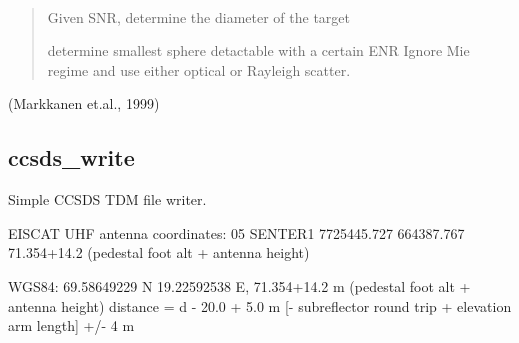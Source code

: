 \documentclass[letterpaper,10pt,english]{sphinxmanual}
\begin{document}
\begin{fulllineitems}
\label{\detokenize{modules/debris:debris.target_diameter}}~\begin{quote}

Given SNR, determine the diameter of the target

determine smallest sphere detactable with a certain ENR
Ignore Mie regime and use either optical or Rayleigh scatter.
\end{quote}

(Markkanen et.al., 1999)

\end{fulllineitems}



\subsection{ccsds\_write}
\label{\detokenize{modules/ccsds_write:module-ccsds_write}}\label{\detokenize{modules/ccsds_write:ccsds-write}}\label{\detokenize{modules/ccsds_write::doc}}
Simple CCSDS TDM file writer.

EISCAT UHF antenna coordinates:
05 SENTER1              7725445.727  664387.767   71.354+14.2 (pedestal foot alt + antenna height)

WGS84: 69.58649229 N 19.22592538 E, 71.354+14.2 m (pedestal foot alt + antenna height)
distance = d - 20.0 + 5.0 m {[}- subreflector round trip + elevation arm length{]} +/- 4 m

\end{document}

